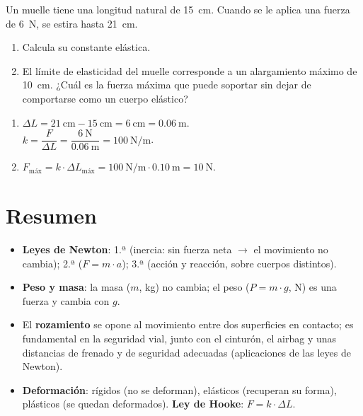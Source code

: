 \begin{exercise}
    Un muelle tiene una longitud natural de \qty{15}{\cm}. Cuando se le aplica una fuerza de \qty{6}{\newton}, se estira hasta \qty{21}{\cm}.
    \begin{enumerate}[label=\letraminuscula]
        \item Calcula su constante elástica.
        \item El límite de elasticidad del muelle corresponde a un alargamiento máximo de \qty{10}{\cm}. ¿Cuál es la fuerza máxima que puede soportar sin dejar de comportarse como un cuerpo elástico?
    \end{enumerate}
    \begin{solu}
        \begin{enumerate}[label=\alph*)]
            \item \(\Delta L = \qty{21}{\cm} - \qty{15}{\cm} = \qty{6}{\cm} = \qty{0.06}{\m}\). \\
            \(k = \dfrac{F}{\Delta L} = \dfrac{\qty{6}{\newton}}{\qty{0.06}{\m}} = \qty{100}{\newton\per\metre}\).
            \item \(F_{\text{máx}} = k \cdot \Delta L_{\text{máx}} = \qty{100}{\newton\per\metre} \cdot \qty{0.10}{\m} = \qty{10}{\newton}\).
        \end{enumerate}
    \end{solu}
\end{exercise}



\section*{Resumen}

\begin{itemize}
    \item \textbf{Leyes de Newton}: 1.ª (inercia: sin fuerza neta \(\to\) el movimiento no cambia); 2.ª (\(F = m \cdot a\)); 3.ª (acción y reacción, sobre cuerpos distintos).
    \item \textbf{Peso y masa}: la masa (\(m\), kg) no cambia; el peso (\(P = m \cdot g\), N) es una fuerza y cambia con \(g\).
    \item El \textbf{rozamiento} se opone al movimiento entre dos superficies en contacto; es fundamental en la seguridad vial, junto con el cinturón, el airbag y unas distancias de frenado y de seguridad adecuadas (aplicaciones de las leyes de Newton).
    \item \textbf{Deformación}: rígidos (no se deforman), elásticos (recuperan su forma), plásticos (se quedan deformados). \textbf{Ley de Hooke}: \(F = k \cdot \Delta L\).
\end{itemize}

